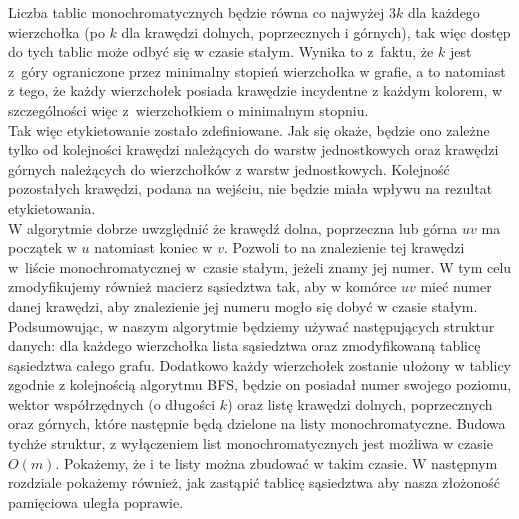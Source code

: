 \documentclass[12pt,a4paper,titlepage]{article}
\newcommand\tab[1][1cm]{\hspace*{#1}}
\begin{document}
\tab[0.6cm]Liczba tablic monochromatycznych będzie równa co najwyżej $3k$ dla każdego wierzchołka (po $k$ dla krawędzi dolnych, poprzecznych i górnych), tak więc dostęp do tych tablic może odbyć się w czasie stałym. Wynika to z~faktu, że $k$ jest z~góry ograniczone przez minimalny stopień wierzchołka w grafie, a to natomiast z tego, że każdy wierzchołek posiada krawędzie incydentne z każdym kolorem, w szczególności więc z~wierzchołkiem o minimalnym stopniu. \\
\tab[0.6cm]Tak więc etykietowanie zostało zdefiniowane. Jak się okaże, będzie ono zależne tylko od kolejności krawędzi należących do warstw jednostkowych oraz krawędzi górnych należących do wierzchołków z warstw jednostkowych. Kolejność pozostałych krawędzi, podana na wejściu, nie będzie miała wpływu na rezultat etykietowania. \\
\tab[0.6cm]W algorytmie dobrze uwzględnić że krawędź dolna, poprzeczna lub górna $uv$ ma początek w $u$ natomiast koniec w $v$. Pozwoli to na znalezienie tej krawędzi w~liście monochromatycznej w~czasie stałym, jeżeli znamy jej numer. W tym celu zmodyfikujemy również macierz sąsiedztwa tak, aby w komórce $uv$ mieć numer danej krawędzi, aby znalezienie jej numeru mogło się dobyć w czasie stałym. \\
\tab[0.6cm]Podsumowując, w naszym algorytmie będziemy używać następujących struktur danych: dla każdego wierzchołka lista sąsiedztwa oraz zmodyfikowaną tablicę sąsiedztwa całego grafu. Dodatkowo każdy wierzchołek zostanie ułożony w tablicy zgodnie z kolejnością algorytmu BFS, będzie on posiadał numer swojego poziomu, wektor współrzędnych (o długości $k$) oraz listę krawędzi dolnych, poprzecznych oraz górnych, które następnie będą dzielone na listy monochromatyczne. Budowa tychże struktur, z wyłączeniem list monochromatycznych jest możliwa w czasie $O(m)$. Pokażemy, że i te listy można zbudować w takim czasie. W następnym rozdziale pokażemy również, jak zastąpić tablicę sąsiedztwa aby nasza złożoność pamięciowa uległa poprawie. \\
\\
\end{document}
